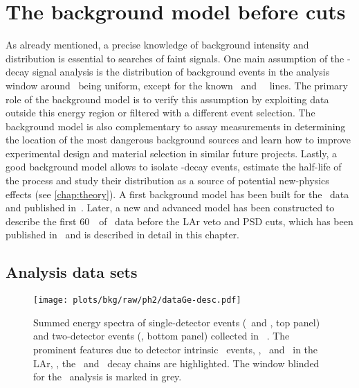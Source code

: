 
\chapter{The background model before cuts}\label{chap:bkgbefore}

As already mentioned, a precise knowledge of background intensity and distribution is
essential to searches of faint signals. One main assumption of the \onbb-decay signal
analysis is the distribution of background events in the analysis window around \qbb\
being uniform, except for the known \Tl\ and \Bil\ \g\ lines. The primary role of the
background model is to verify this assumption by exploiting data outside this energy
region or filtered with a different event selection. The background model is also
complementary to assay measurements in determining the location of the most dangerous
background sources and learn how to improve experimental design and material selection in
similar future projects. Lastly, a good background model allows to isolate \nnbb-decay
events, estimate the half-life of the process and study their distribution as a source of
potential new-physics effects (see \cref{chap:theory}).
\newpar
A first background model has been built for the \phaseone\ data and published
in~\cite{Agostini2013a}. Later, a new and advanced model has been constructed to describe
the first 60~\kgyr\ of \phasetwo\ data before the LAr veto and PSD cuts, which has been
published in~\cite{Agostini2019b} and is described in detail in this chapter.

\section{Analysis data sets}%
\label{sec:bkg:raw:data}

\begin{table}[t]
  \small
  \centering
  \caption{%
    Properties of the data sets considered in this analysis. Further
    details about the \gerda\ detectors can be found in past
    publications~\cite{Agostini2013a, Agostini2018a}.
  }\label{tab:bkg:raw:ph2:datasets}
  
\end{table}%

\begin{figure}
  \centering
  \texttt{[image: plots/bkg/raw/ph2/dataGe-desc.pdf]}
  \caption{%
    Summed energy spectra of single-detector events (\enrBEGeII\ and \enrCoaxII, top
    panel) and two-detector events (\enrGeII, bottom panel) collected in \gerda\
    \phasetwo.  The prominent features due to detector intrinsic \nnbb\ events, \kvz,
    \Arl\ and \Kr\ in the LAr, \kvn, the \Thh\ and \Uh\ decay chains are highlighted. The
    window blinded for the \onbb\ analysis is marked in grey.
  }\label{fig:bkg:raw:ph2:datasets}
\end{figure}

